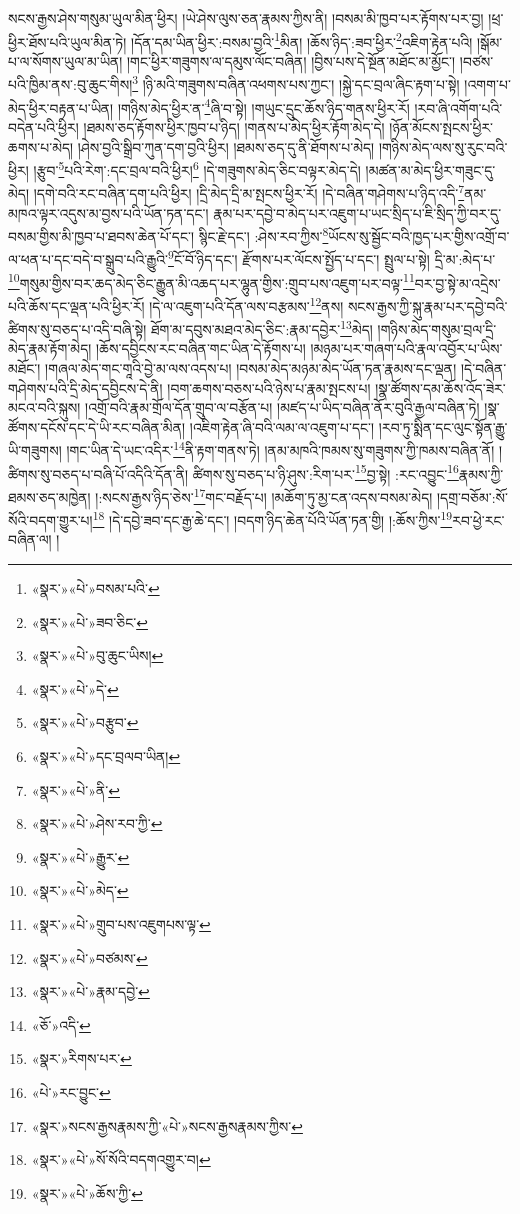 སངས་རྒྱས་ཤེས་གསུམ་ཡུལ་མིན་ཕྱིར། །ཡེ་ཤེས་ལུས་ཅན་རྣམས་ཀྱིས་ནི། །བསམ་མི་ཁྱབ་པར་རྟོགས་པར་བྱ། །ཕྲ་ཕྱིར་ཐོས་པའི་ཡུལ་མིན་ཏེ། །དོན་དམ་ཡིན་ཕྱིར་:བསམ་བྱའི་\footnote{«སྣར་»«པེ་»བསམ་པའི་}མིན། །ཆོས་ཉིད་:ཟབ་ཕྱིར་\footnote{«སྣར་»«པེ་»ཟབ་ཅིང་}འཇིག་རྟེན་པའི། །སྒོམ་པ་ལ་སོགས་ཡུལ་མ་ཡིན། །གང་ཕྱིར་གཟུགས་ལ་དམུས་ལོང་བཞིན། །བྱིས་པས་དེ་སྔོན་མཐོང་མ་མྱོང་། །བཙས་པའི་ཁྱིམ་ནས་:བུ་ཆུང་གིས།\footnote{«སྣར་»«པེ་»བུ་ཆུང་ཡིས།} །ཉི་མའི་གཟུགས་བཞིན་འཕགས་པས་ཀྱང་། །སྐྱེ་དང་བྲལ་ཞིང་རྟག་པ་སྟེ། །འགག་པ་མེད་ཕྱིར་བརྟན་པ་ཡིན། །གཉིས་མེད་ཕྱིར་ན་\footnote{«སྣར་»«པེ་»དེ་}ཞི་བ་སྟེ། །གཡུང་དྲུང་ཆོས་ཉིད་གནས་ཕྱིར་རོ། །རབ་ཞི་འགོག་པའི་བདེན་པའི་ཕྱིར། །ཐམས་ཅད་རྟོགས་ཕྱིར་ཁྱབ་པ་ཉིད། །གནས་པ་མེད་ཕྱིར་རྟོག་མེད་དེ། །ཉོན་མོངས་སྤངས་ཕྱིར་ཆགས་པ་མེད། །ཤེས་བྱའི་སྒྲིབ་ཀུན་དག་བྱའི་ཕྱིར། །ཐམས་ཅད་དུ་ནི་ཐོགས་པ་མེད། །གཉིས་མེད་ལས་སུ་རུང་བའི་ཕྱིར། །རྩུབ་\footnote{«སྣར་»«པེ་»བརྩུབ་}པའི་རེག་:དང་བྲལ་བའི་ཕྱིར།\footnote{«སྣར་»«པེ་»དང་བྲལབ་ཡིན།} །དེ་གཟུགས་མེད་ཅིང་བལྟར་མེད་དེ། །མཚན་མ་མེད་ཕྱིར་གཟུང་དུ་མེད། །དགེ་བའི་རང་བཞིན་དག་པའི་ཕྱིར། །དྲི་མེད་དྲི་མ་སྤངས་ཕྱིར་རོ། །དེ་བཞིན་གཤེགས་པ་ཉིད་འདི་\footnote{«སྣར་»«པེ་»ནི་}ནམ་མཁའ་ལྟར་འདུས་མ་བྱས་པའི་ཡོན་ཏན་དང་། རྣམ་པར་དབྱེ་བ་མེད་པར་འཇུག་པ་ཡང་སྲིད་པ་ཇི་སྲིད་ཀྱི་བར་དུ་བསམ་གྱིས་མི་ཁྱབ་པ་ཐབས་ཆེན་པོ་དང་། སྙིང་རྗེ་དང་། :ཤེས་རབ་ཀྱིས་\footnote{«སྣར་»«པེ་»ཤེས་རབ་ཀྱི་}ཡོངས་སུ་སྦྱོང་བའི་ཁྱད་པར་གྱིས་འགྲོ་བ་ལ་ཕན་པ་དང་བདེ་བ་སྒྲུབ་པའི་རྒྱུའི་\footnote{«སྣར་»«པེ་»རྒྱུར་}ངོ་བོ་ཉིད་དང་། རྫོགས་པར་ལོངས་སྤྱོད་པ་དང་། སྤྲུལ་པ་སྟེ། དྲི་མ་:མེད་པ་\footnote{«སྣར་»«པེ་»མེད་}གསུམ་གྱིས་བར་ཆད་མེད་ཅིང་རྒྱུན་མི་འཆད་པར་ལྷུན་གྱིས་:གྲུབ་པས་འཇུག་པར་བལྟ་\footnote{«སྣར་»«པེ་»གྲུབ་པས་འཇུགཔས་ལྟ་}བར་བྱ་སྟེ་མ་འདྲེས་པའི་ཆོས་དང་ལྡན་པའི་ཕྱིར་རོ། །དེ་ལ་འཇུག་པའི་དོན་ལས་བརྩམས་\footnote{«སྣར་»«པེ་»བཙམས་}ནས། སངས་རྒྱས་ཀྱི་སྐུ་རྣམ་པར་དབྱེ་བའི་ཚིགས་སུ་བཅད་པ་འདི་བཞི་སྟེ། ཐོག་མ་དབུས་མཐའ་མེད་ཅིང་:རྣམ་དབྱེར་\footnote{«སྣར་»«པེ་»རྣམ་དབྱེ་}མེད། །གཉིས་མེད་གསུམ་བྲལ་དྲི་མེད་རྣམ་རྟོག་མེད། །ཆོས་དབྱིངས་རང་བཞིན་གང་ཡིན་དེ་རྟོགས་པ། །མཉམ་པར་གཞག་པའི་རྣལ་འབྱོར་པ་ཡིས་མཐོང་། །གཞལ་མེད་གང་གཱའི་བྱེ་མ་ལས་འདས་པ། །བསམ་མེད་མཉམ་མེད་ཡོན་ཏན་རྣམས་དང་ལྡན། །དེ་བཞིན་གཤེགས་པའི་དྲི་མེད་དབྱིངས་དེ་ནི། །བག་ཆགས་བཅས་པའི་ཉེས་པ་རྣམ་སྤངས་པ། །སྣ་ཚོགས་དམ་ཆོས་འོད་ཟེར་མངའ་བའི་སྐུས། །འགྲོ་བའི་རྣམ་གྲོལ་དོན་གྲུབ་ལ་བརྩོན་པ། །མཛད་པ་ཡིད་བཞིན་ནོར་བུའི་རྒྱལ་བཞིན་ཏེ། །སྣ་ཚོགས་དངོས་དང་དེ་ཡི་རང་བཞིན་མིན། །འཇིག་རྟེན་ཞི་བའི་ལམ་ལ་འཇུག་པ་དང་། །རབ་ཏུ་སྨིན་དང་ལུང་སྟོན་རྒྱུ་ཡི་གཟུགས། །གང་ཡིན་དེ་ཡང་འདིར་\footnote{«ཅོ་»འདི་}ནི་རྟག་གནས་ཏེ། །ནམ་མཁའི་ཁམས་སུ་གཟུགས་ཀྱི་ཁམས་བཞིན་ནོ། །ཚིགས་སུ་བཅད་པ་བཞི་པོ་འདིའི་དོན་ནི། ཚིགས་སུ་བཅད་པ་ཉི་ཤུས་:རིག་པར་\footnote{«སྣར་»རིགས་པར་}བྱ་སྟེ། :རང་འབྱུང་\footnote{«པེ་»རང་བྱུང་}རྣམས་ཀྱི་ཐམས་ཅད་མཁྱེན། །:སངས་རྒྱས་ཉིད་ཅེས་\footnote{«སྣར་»སངས་རྒྱསརྣམས་ཀྱི་«པེ་»སངས་རྒྱསརྣམས་ཀྱིས་}གང་བརྗོད་པ། །མཆོག་ཏུ་མྱ་ངན་འདས་བསམ་མེད། །དགྲ་བཅོམ་:སོ་སོའི་བདག་གྱུར་པ།\footnote{«སྣར་»«པེ་»སོ་སོའི་བདགའགྱུར་བ།} །དེ་དབྱེ་ཟབ་དང་རྒྱ་ཆེ་དང་། །བདག་ཉིད་ཆེན་པོའི་ཡོན་ཏན་གྱི། །:ཆོས་ཀྱིས་\footnote{«སྣར་»«པེ་»ཆོས་ཀྱི་}རབ་ཕྱེ་རང་བཞིན་ལ། །
